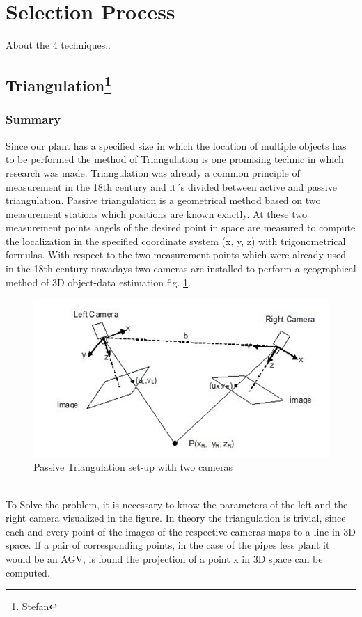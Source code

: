 \section{Selection Process} 

About the 4 techniques..

\subsection[Triangulation]{Triangulation\footnote{Stefan}} %
\subsubsection*{Summary}
Since our plant has a specified size in which the location of multiple objects has to be performed the method of Triangulation is one promising technic in which research was made. 
Triangulation was already a common principle of measurement in the 18th century and it´s divided between active and passive triangulation. Passive triangulation is a geometrical method based on two measurement stations which positions are known exactly. At these two measurement points angels of the desired point in space are measured to compute the localization in the specified coordinate system (x, y, z) with trigonometrical formulas.
With respect to the two measurement points which were already used in the 18th century nowadays two cameras are installed to perform a geographical method of 3D object-data estimation fig. \ref{Triangulation}.
\begin{figure}[!htbp]
\centering
\includegraphics[width = 16cm]{Pictures/Triangulation}
\caption{Passive Triangulation set-up with two cameras}
\label{Triangulation}
\end{figure}\\
To Solve the problem, it is necessary to know the parameters of the left and the right camera visualized in the figure. In theory the triangulation is trivial, since each and every point of the images of the respective cameras maps to a line in 3D space. If a pair of corresponding points, in the case of the pipes less plant it would be an AGV, is found the projection of a point x in 3D space can be computed. 
